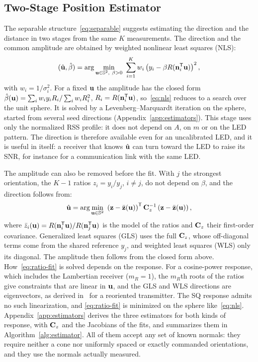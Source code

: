 \subsection{Two-Stage Position Estimator}
\label{subsec:estimator}
The separable structure~\eqref{eq:separable} suggests estimating the direction and the distance in two stages from the same $K$ measurements. The direction and the common amplitude are obtained by weighted nonlinear least squares (NLS):
\begin{equation}
 (\hat{\mathbf{u}},\hat\beta)=\arg\min_{\mathbf{u}\in\mathbb S^2,\ \beta>0}\ \sum_{i=1}^{K}w_i\left(y_i-\beta R(\mathbf{n}_i^{\mathsf T}\mathbf{u})\right)^2,
 \label{eq:nls}
\end{equation}
with $w_i=1/\sigma_i^2$. For a fixed $\mathbf{u}$ the amplitude has the closed form $\hat\beta(\mathbf{u})=\sum_iw_iy_iR_i/\sum_iw_iR_i^2$, $R_i=R(\mathbf{n}_i^{\mathsf T}\mathbf{u})$, so~\eqref{eq:nls} reduces to a search over the unit sphere. It is solved by a Levenberg--Marquardt iteration on the sphere, started from several seed directions (Appendix~\ref{app:estimators}). This stage uses only the normalized RSS profile: it does not depend on $A$, on $m$ or on the LED pattern. The direction is therefore available even for an uncalibrated LED, and it is useful in itself: a receiver that knows $\hat{\mathbf{u}}$ can turn toward the LED to raise its SNR, for instance for a communication link with the same LED.

The amplitude can also be removed before the fit. With $j$ the strongest orientation, the $K-1$ ratios $z_i=y_i/y_j$, $i\neq j$, do not depend on $\beta$, and the direction follows from:
\begin{equation}
 {\hat{\mathbf{u}}=\arg\min_{\mathbf{u}\in\mathbb S^2}\ \left(\mathbf{z}-\bar{\mathbf{z}}(\mathbf{u})\right)^{\mathsf T}\mathbf{C}_z^{-1}\left(\mathbf{z}-\bar{\mathbf{z}}(\mathbf{u})\right),}
 \label{eq:ratio-fit}
\end{equation}
where $\bar z_i(\mathbf{u})=R(\mathbf{n}_i^{\mathsf T}\mathbf{u})/R(\mathbf{n}_j^{\mathsf T}\mathbf{u})$ is the model of the ratios and $\mathbf{C}_z$ their first-order covariance. Generalized least squares (GLS) uses the full $\mathbf{C}_z$, whose off-diagonal terms come from the shared reference $y_j$, and weighted least squares (WLS) only its diagonal. The amplitude then follows from the closed form above. How~\eqref{eq:ratio-fit} is solved depends on the response. For a cosine-power response, which includes the Lambertian receiver ($m_R=1$), the $m_R$th roots of the ratios give constraints that are linear in $\mathbf{u}$, and the GLS and WLS directions are eigenvectors, as derived in~\cite{Acuna2026} for a reoriented transmitter. The SQ response admits no such linearization, and \eqref{eq:ratio-fit} is minimized on the sphere like~\eqref{eq:nls}. Appendix~\ref{app:estimators} derives the three estimators for both kinds of response, with $\mathbf{C}_z$ and the Jacobians of the fits, and summarizes them in Algorithm~\ref{alg:estimator}. All of them accept any set of known normals: they require neither a cone nor uniformly spaced or exactly commanded orientations, and they use the normals actually measured.

